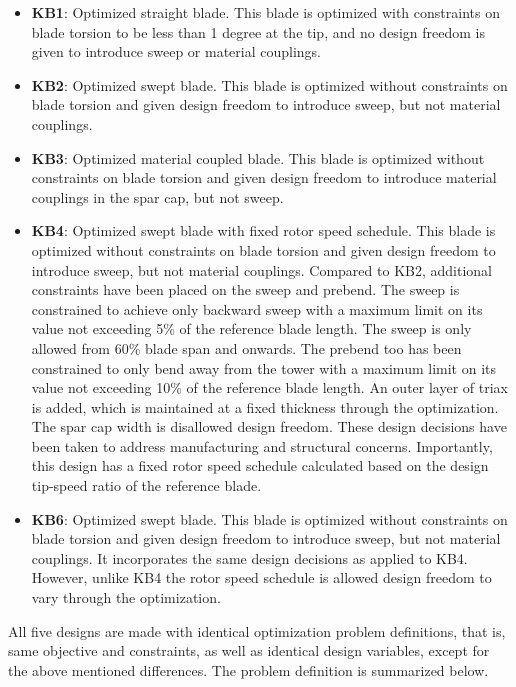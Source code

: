 \begin{itemize}
	\item \textbf{KB1}: Optimized straight blade. This blade is optimized with constraints on blade torsion to be less than 1 degree at the tip, and no design freedom is given to introduce sweep or material couplings.
	\item \textbf{KB2}: Optimized swept blade. This blade is optimized without constraints on blade torsion and given design freedom to introduce sweep, but not material couplings.
	\item \textbf{KB3}: Optimized material coupled blade. This blade is optimized without constraints on blade torsion and given design freedom to introduce material couplings in the spar cap, but not sweep.
	\item \textbf{KB4}: Optimized swept blade with fixed rotor speed schedule. This blade is optimized without constraints on blade torsion and given design freedom to introduce sweep, but not material couplings. Compared to KB2, additional constraints have been placed on the sweep and prebend. The sweep is constrained to achieve only backward sweep with a maximum limit on its value not exceeding 5\% of the reference blade length. The sweep is only allowed from 60\% blade span and onwards. The prebend too has been constrained to only bend away from the tower with a maximum limit on its value not exceeding 10\% of the reference blade length. An outer layer of triax is added, which is maintained at a fixed thickness through the optimization. The spar cap width is disallowed design freedom. These design decisions have been taken to address manufacturing and structural concerns. Importantly, this design has a fixed rotor speed schedule calculated based on the design tip-speed ratio of the reference blade. 
	\item \textbf{KB6}: Optimized swept blade. This blade is optimized without constraints on blade torsion and given design freedom to introduce sweep, but not material couplings. It incorporates the same design decisions as applied to KB4. However, unlike KB4 the rotor speed schedule is allowed design freedom to vary through the optimization. 
\end{itemize}

All five designs are made with identical optimization problem definitions, that is, same objective and constraints, as well as identical design variables, except for the above mentioned differences. The problem definition is summarized below.

